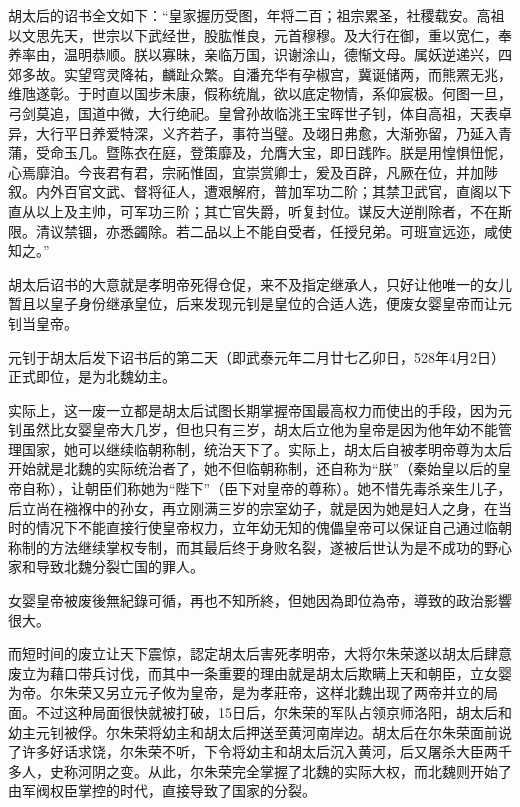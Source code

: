 胡太后的诏书全文如下：“皇家握历受图，年将二百；祖宗累圣，社稷载安。高祖以文思先天，世宗以下武经世，股肱惟良，元首穆穆。及大行在御，重以宽仁，奉养率由，温明恭顺。朕以寡昧，亲临万国，识谢涂山，德惭文母。属妖逆递兴，四郊多故。实望穹灵降祐，麟趾众繁。自潘充华有孕椒宫，冀诞储两，而熊罴无兆，维虺遂彰。于时直以国步未康，假称统胤，欲以底定物情，系仰宸极。何图一旦，弓剑莫追，国道中微，大行绝祀。皇曾孙故临洮王宝晖世子钊，体自高祖，天表卓异，大行平日养爱特深，义齐若子，事符当璧。及翊日弗愈，大渐弥留，乃延入青蒲，受命玉几。暨陈衣在庭，登策靡及，允膺大宝，即日践阼。朕是用惶惧忸怩，心焉靡洎。今丧君有君，宗祏惟固，宜崇赏卿士，爰及百辟，凡厥在位，并加陟叙。内外百官文武、督将征人，遭艰解府，普加军功二阶；其禁卫武官，直阁以下直从以上及主帅，可军功三阶；其亡官失爵，听复封位。谋反大逆削除者，不在斯限。清议禁锢，亦悉蠲除。若二品以上不能自受者，任授兒弟。可班宣远迩，咸使知之。”

胡太后诏书的大意就是孝明帝死得仓促，来不及指定继承人，只好让他唯一的女儿暂且以皇子身份继承皇位，后来发现元钊是皇位的合适人选，便废女婴皇帝而让元钊当皇帝。

元钊于胡太后发下诏书后的第二天（即武泰元年二月廿七乙卯日，528年4月2日）正式即位，是为北魏幼主。

实际上，这一废一立都是胡太后试图长期掌握帝国最高权力而使出的手段，因为元钊虽然比女婴皇帝大几岁，但也只有三岁，胡太后立他为皇帝是因为他年幼不能管理国家，她可以继续临朝称制，统治天下了。实际上，胡太后自被孝明帝尊为太后开始就是北魏的实际统治者了，她不但临朝称制，还自称为“朕”（秦始皇以后的皇帝自称），让朝臣们称她为“陛下”（臣下对皇帝的尊称）。她不惜先毒杀亲生儿子，后立尚在襁褓中的孙女，再立刚满三岁的宗室幼子，就是因为她是妇人之身，在当时的情况下不能直接行使皇帝权力，立年幼无知的傀儡皇帝可以保证自己通过临朝称制的方法继续掌权专制，而其最后终于身败名裂，遂被后世认为是不成功的野心家和导致北魏分裂亡国的罪人。

女婴皇帝被废後無紀錄可循，再也不知所終，但她因為即位為帝，導致的政治影響很大。

而短时间的废立让天下震惊，認定胡太后害死孝明帝，大将尔朱荣遂以胡太后肆意废立为藉口带兵讨伐，而其中一条重要的理由就是胡太后欺瞒上天和朝臣，立女婴为帝。尔朱荣又另立元子攸为皇帝，是为孝莊帝，这样北魏出现了两帝并立的局面。不过这种局面很快就被打破，15日后，尔朱荣的军队占领京师洛阳，胡太后和幼主元钊被俘。尔朱荣将幼主和胡太后押送至黄河南岸边。胡太后在尔朱荣面前说了许多好话求饶，尔朱荣不听，下令将幼主和胡太后沉入黄河，后又屠杀大臣两千多人，史称河阴之变。从此，尔朱荣完全掌握了北魏的实际大权，而北魏则开始了由军阀权臣掌控的时代，直接导致了国家的分裂。

